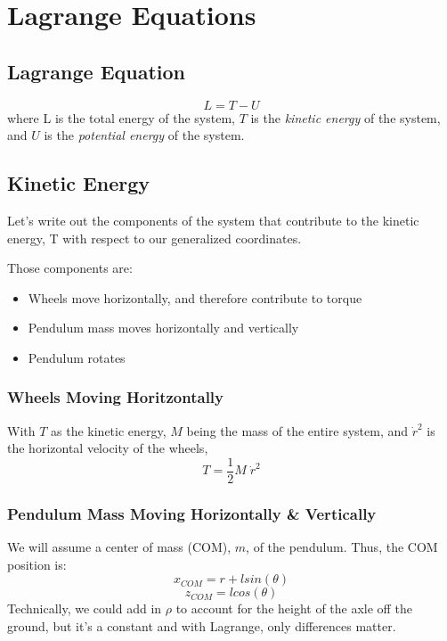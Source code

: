 \section{Lagrange Equations}

\subsection{Lagrange Equation}

\begin{equation}
	L = T - U
\end{equation}
where L is the total energy of the system, $T$ is the \textit{kinetic energy} of the system, and $U$ is the \textit{potential energy} of the system.

\subsection{Kinetic Energy}

Let's write out the components of the system that contribute to the kinetic energy, T with respect to our generalized coordinates.

Those components are:

\begin{itemize}
	\item Wheels move horizontally, and therefore contribute to torque
	\item Pendulum mass moves horizontally and vertically
	\item Pendulum rotates
\end{itemize}
	
\subsubsection{Wheels Moving Horitzontally}

With $T$ as the kinetic energy, $M$ being the mass of the entire system, and $\dot r^{2}$ is the horizontal velocity of the wheels,
\begin{equation}
	T = \frac{1}{2} M \; \dot r^{2}
\end{equation}

\subsubsection{Pendulum Mass Moving Horizontally \& Vertically}

We will assume a center of mass (COM), $m$, of the pendulum.
Thus, the COM position is:
\begin{equation}
	x_{COM} = r + l sin(\theta)
\end{equation}
\begin{equation}
	z_{COM} = l cos(\theta)
\end{equation}
Technically, we could add in $\rho$ to account for the height of the axle off the ground, but it's a constant and with Lagrange, only differences matter.

